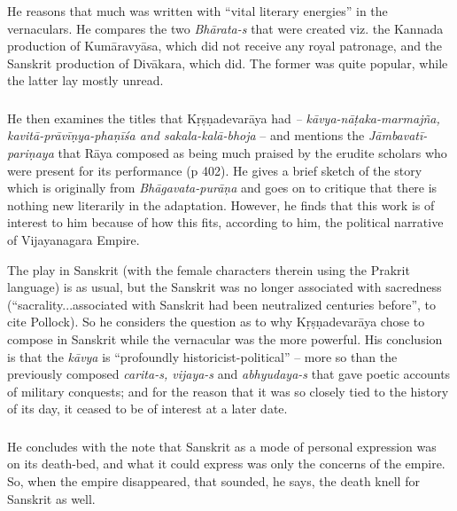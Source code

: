 \subsubsection{} He reasons that much was written with “vital literary energies” in the vernaculars. He compares the two {\sl Bhārata-s} that were created viz. the Kannada production of Kumāravyāsa, which did not receive any royal patronage, and the Sanskrit production of Divākara, which did. The former was quite popular, while the latter lay mostly unread.
\vskip 1.5pt

\subsubsection{} He then examines the titles that Kṛṣṇadevarāya had {\sl – kāvya-nāṭaka-marmajña, kavitā-prāvīṇya-phaṇīśa and sakala-kalā-bhoja} – and mentions the {\sl Jāmbavatī-pariṇaya} that Rāya composed as being much praised by the erudite scholars who were present for its performance (p 402). He gives a brief sketch of the story which is originally from {\sl Bhāgavata-purāṇa} and goes on to critique that there is nothing new literarily in the adaptation. However, he finds that this work is of interest to him because of how this fits, according to him, the political narrative of Vijayanagara Empire.

The play in Sanskrit (with the female characters therein using the Prakrit language) is as usual, but the Sanskrit was no longer associated with sacredness (“sacrality...associated with Sanskrit had been neutralized centuries before”, to cite Pollock). So he considers the question as to why Kṛṣṇadevarāya chose to compose in Sanskrit while the vernacular was the more powerful. His conclusion is that the {\sl kāvya} is “profoundly historicist-political” – more so than the previously composed {\sl carita-s, vijaya-s} and {\sl abhyudaya-s} that gave poetic accounts of military conquests; and for the reason that it was so closely tied to the history of its day, it ceased to be of interest at a later date.	

\subsubsection{} He concludes with the note that Sanskrit as a mode of personal expression was on its death-bed, and what it could express was only the concerns of the empire. So, when the empire disappeared, that sounded, he says, the death knell for Sanskrit as well. 
\vskip -40pt

